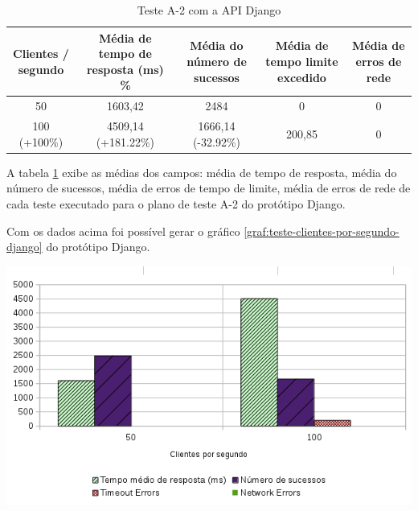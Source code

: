   \begin{table}[H]
    \centering
    \footnotesize
    \setlength{\abovecaptionskip}{0pt}
    \setlength{\belowcaptionskip}{0pt}
    \caption[Teste A-2 com a API Django]{Teste A-2 com a API Django}
    \label{tab:sumario-resultado-plano-teste-a-2}
    \begin{tabular}{c|c|c|c|c}
      \hline \hline
      Clientes / segundo  & 	Média de tempo de resposta (ms) \% &	Média do número de sucessos & 	Média de tempo limite excedido &	Média de erros de rede \\ 
      \hline \hline
      50 &			1603,42 & 				2484 & 					0 &					0 \\
      100 (+100\%)&		4509,14 (+181.22\%) & 			1666,14 (-32.92\%) & 			200,85  &				0 \\
      \hline \hline
    \end{tabular}
  \end{table}
  
  A tabela \ref{tab:sumario-resultado-plano-teste-a-2} exibe as médias dos campos: média de tempo de resposta, 
  média do número de sucessos, média de erros de tempo de limite, média de erros de rede de cada teste executado 
  para o plano de teste A-2 do protótipo Django.
  
  Com os dados acima foi possível gerar o gráfico \ref{graf:teste-clientes-por-segundo-django} do 
  protótipo Django.
  
  \begin{grafico}[H]
    \setlength{\abovecaptionskip}{5pt}
    \setlength{\belowcaptionskip}{0pt}
    
    \caption[Usuários por segundo no Django]
	    {Usuários por segundo no Django}
    \centering
    \includegraphics[width=.80\textwidth]{imagem/graficos/grafico_django_plano_de_teste_2.png}
    \captionsetup[grafico]{justification=centering}
    \label{graf:teste-clientes-por-segundo-django}
  \end{grafico}
  
